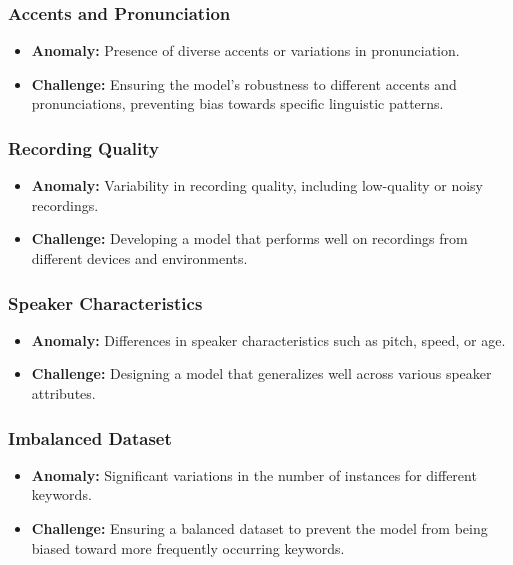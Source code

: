 \subsubsection{Accents and Pronunciation}

\begin{itemize}
	\item \textbf{Anomaly:} Presence of diverse accents or variations in pronunciation.
	\item \textbf{Challenge:} Ensuring the model's robustness to different accents and pronunciations, preventing bias towards specific linguistic patterns.
\end{itemize}

\subsubsection{Recording Quality}

\begin{itemize}
	\item \textbf{Anomaly:} Variability in recording quality, including low-quality or noisy recordings.
	\item \textbf{Challenge:} Developing a model that performs well on recordings from different devices and environments.
\end{itemize}

\subsubsection{Speaker Characteristics}

\begin{itemize}
	\item \textbf{Anomaly:} Differences in speaker characteristics such as pitch, speed, or age.
	\item \textbf{Challenge:} Designing a model that generalizes well across various speaker attributes.
\end{itemize}

\subsubsection{Imbalanced Dataset}

\begin{itemize}
	\item \textbf{Anomaly:} Significant variations in the number of instances for different keywords.
	\item \textbf{Challenge:} Ensuring a balanced dataset to prevent the model from being biased toward more frequently occurring keywords.
\end{itemize}

